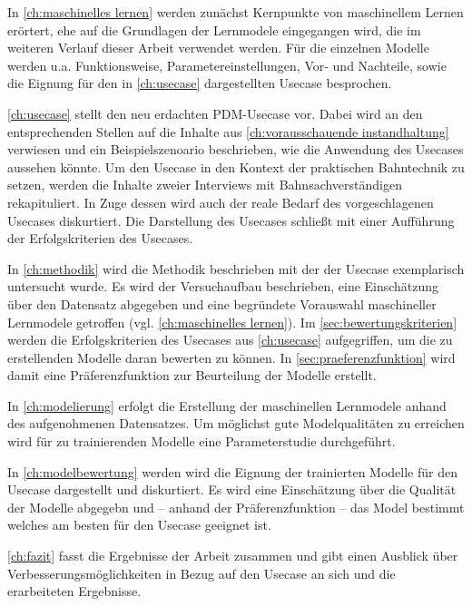 In \cref{ch:maschinelles lernen} werden zunächst Kernpunkte von maschinellem Lernen erörtert, ehe auf die Grundlagen der Lernmodele eingegangen wird, die im weiteren Verlauf dieser Arbeit verwendet werden. Für die einzelnen Modelle werden u.a. Funktionsweise, Parametereinstellungen, Vor- und Nachteile, sowie die Eignung für den in \cref{ch:usecase} dargestellten Usecase besprochen.

\cref{ch:usecase} stellt den neu erdachten PDM-Usecase vor. Dabei wird an den entsprechenden Stellen auf die Inhalte aus \cref{ch:vorausschauende instandhaltung} verwiesen und ein Beispielszenoario beschrieben, wie die Anwendung des Usecases aussehen könnte. Um den Usecase in den Kontext der praktischen Bahntechnik zu setzen, werden die Inhalte zweier Interviews mit Bahnsachverständigen rekapituliert. In Zuge dessen wird auch der reale Bedarf des vorgeschlagenen Usecases diskurtiert. Die Darstellung des Usecases schließt mit einer Aufführung der Erfolgskriterien des Usecases.

In \cref{ch:methodik} wird die Methodik beschrieben mit der der Usecase exemplarisch untersucht wurde. Es wird der Versuchaufbau beschrieben, eine Einschätzung über den Datensatz abgegeben und eine begründete Vorauswahl maschineller Lernmodele getroffen (vgl. \cref{ch:maschinelles lernen}). Im \cref{sec:bewertungskriterien} werden die Erfolgskriterien des Usecases aus \cref{ch:usecase} aufgegriffen, um die zu erstellenden Modelle daran bewerten zu können. In \cref{sec:praeferenzfunktion} wird damit eine Präferenzfunktion zur Beurteilung der Modelle erstellt.

In \cref{ch:modelierung} erfolgt die Erstellung der maschinellen Lernmodele anhand des aufgenohmenen Datensatzes. Um möglichst gute Modelqualitäten zu erreichen wird für zu trainierenden Modelle eine Parameterstudie durchgeführt.

In \cref{ch:modelbewertung} werden wird die Eignung der trainierten Modelle für den Usecase dargestellt und diskurtiert. Es wird eine Einschätzung über die Qualität der Modelle abgegebn und -- anhand der Präferenzfunktion -- das Model bestimmt welches am besten für den Usecase geeignet ist.

\cref{ch:fazit} fasst die Ergebnisse der Arbeit zusammen und gibt einen Ausblick über Verbesserungsmöglichkeiten in Bezug auf den Usecase an sich und die erarbeiteten Ergebnisse.